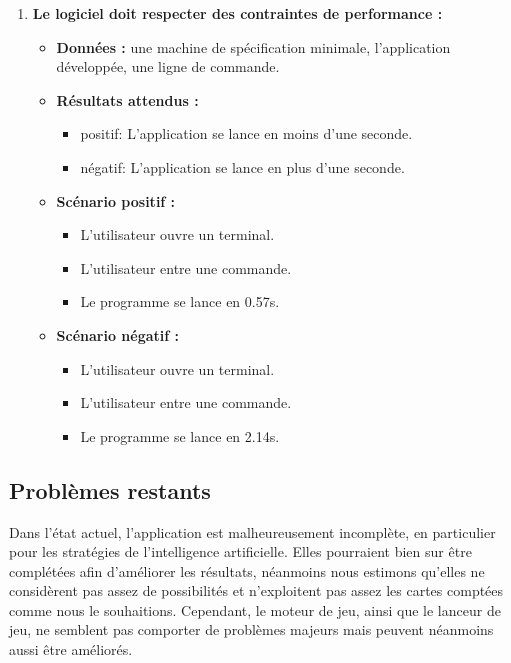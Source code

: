 \begin{enumerate}
    \item \textbf{Le logiciel doit respecter des contraintes de performance :} 
    \begin{itemize}
        \item \textbf{Données :} une machine de spécification minimale, l'application développée, une ligne de commande.
        \item \textbf{Résultats attendus :}
        \begin{itemize}
            \item positif: L'application se lance en moins d'une seconde.
            \item négatif: L'application se lance en plus d'une seconde.
        \end{itemize}
        \item \textbf{Scénario positif :}
        \begin{itemize}
            \item L’utilisateur ouvre un terminal.
            \item L’utilisateur entre une commande.
            \item Le programme se lance en 0.57s.
        \end{itemize}
        \item \textbf{Scénario négatif :}
        \begin{itemize}
            \item L’utilisateur ouvre un terminal.
            \item L’utilisateur entre une commande.
            \item Le programme se lance en 2.14s.
        \end{itemize}
    \end{itemize}
\end{enumerate}

\clearpage

\subsection{Problèmes restants}
Dans l'état actuel, l'application est malheureusement incomplète, en particulier pour les stratégies de l'intelligence artificielle. Elles pourraient bien sur être complétées afin d'améliorer les résultats, néanmoins nous estimons qu'elles ne considèrent pas assez de possibilités et n'exploitent pas assez les cartes comptées comme nous le souhaitions. Cependant, le moteur de jeu, ainsi que le lanceur de jeu, ne semblent pas comporter de problèmes majeurs mais peuvent néanmoins aussi être améliorés.
